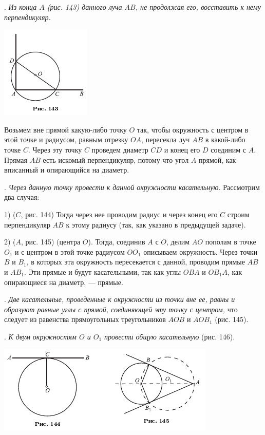 \documentclass[oneside]{book}
\begin{document}
.
\emph{Из конца $A$ \emph{(рис. 143)} данного луча $AB$, не продолжая его, восставить к нему перпендикуляр.}

\includegraphics{pics/ris-143}

Возьмем вне прямой какую-либо точку $O$ так, чтобы окружность с центром в этой точке и радиусом, равным отрезку $OA$, пересекла луч $AB$ в какой-либо точке $C$.
Через эту точку $C$ проведем диаметр $CD$ и конец его $D$ соединим с $A$.
Прямая $AB$ есть искомый перпендикуляр, потому что угол $A$ прямой, как вписанный и опирающийся на диаметр.

.
\emph{Через данную точку провести к данной окружности касательную.}
Рассмотрим два случая:

1)  ($C$, рис. 144) 
Тогда через нее проводим радиус и через конец его $C$ строим перпендикуляр $AB$ к этому радиусу (так, как указано в предыдущей задаче).

2)  ($A$, рис. 145)  (центра $O$).
Тогда, соединив $A$ с $O$, делим $AO$ пополам в точке $O_1$ и с центром в этой точке радиусом $OO_1$ описываем окружность.
Через точки $B$ и $B_1$, в которых эта окружность пересекается с данной, проводим прямые $AB$ и $AB_1$.
Эти прямые и будут касательными, так как углы $OBA$ и $OB_1A$, как опирающиеся на диаметр, — прямые.

.
\emph{Две касательные, проведенные к окружности из точки вне ее, равны и образуют равные углы с прямой, соединяющей эту точку с центром,} что следует из равенства прямоугольных треугольников $AOB$ и $AOB_1$ (рис. 145).

.
\emph{К двум окружностям %
$O$ и $O_1$ провести общую касательную} (рис. 146).

\includegraphics{pics/ris-144-145}
\end{document}

